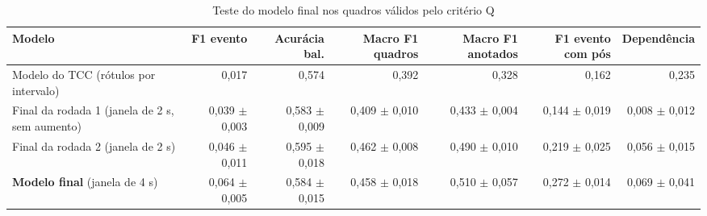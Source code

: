 \begin{table}[htbp]
\centering
\footnotesize
\caption{Teste do modelo final nos quadros válidos pelo critério Q}
\label{tab:modelo-final}
\begin{tabular}{lrrrrrr}
\toprule
Modelo & F1 evento & Acurácia bal. & Macro F1 quadros & Macro F1 anotados & F1 evento com pós & Dependência \\
\midrule
Modelo do TCC (rótulos por intervalo) & 0,017 & 0,574 & 0,392 & 0,328 & 0,162 & 0,235 \\
Final da rodada 1 (janela de 2 s, sem aumento) & 0,039 $\pm$ 0,003 & 0,583 $\pm$ 0,009 & 0,409 $\pm$ 0,010 & 0,433 $\pm$ 0,004 & 0,144 $\pm$ 0,019 & 0,008 $\pm$ 0,012 \\
Final da rodada 2 (janela de 2 s) & 0,046 $\pm$ 0,011 & 0,595 $\pm$ 0,018 & 0,462 $\pm$ 0,008 & 0,490 $\pm$ 0,010 & 0,219 $\pm$ 0,025 & 0,056 $\pm$ 0,015 \\
\textbf{Modelo final} (janela de 4 s) & 0,064 $\pm$ 0,005 & 0,584 $\pm$ 0,015 & 0,458 $\pm$ 0,018 & 0,510 $\pm$ 0,057 & 0,272 $\pm$ 0,014 & 0,069 $\pm$ 0,041 \\
\bottomrule
\end{tabular}
\end{table}
